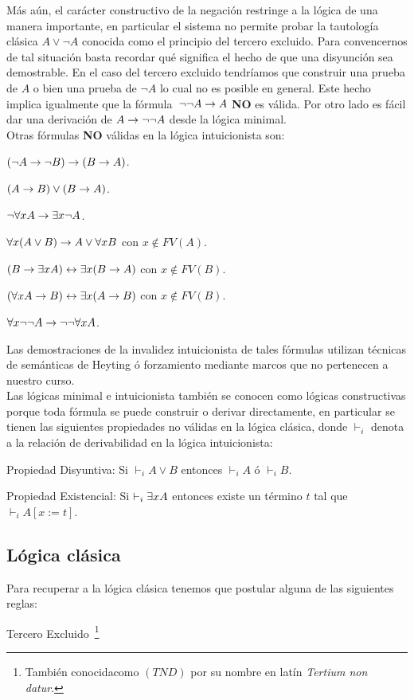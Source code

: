 \documentclass[11pt,letterpaper]{article}
\begin{document}
Más aún, el carácter constructivo de la negación restringe a la lógica de una 
manera importante, en particular el sistema no permite probar la tautología 
clásica $  A\lor\lnot A $
conocida como el principio del tercero excluido. Para convencernos de tal
situación basta recordar qué significa el hecho de que una disyunción sea
demostrable. En el caso del tercero excluido tendríamos que construir 
una prueba de $ A$ o bien una prueba de $\neg A$ lo cual no es posible en
general. Este hecho implica igualmente que la fórmula~$\lnot\lnot A\imp A$
\textbf{NO} es válida. Por otro lado es fácil dar una derivación
de $ A\imp\lnot\lnot A$ desde la lógica minimal. \\
Otras fórmulas \textbf{NO} válidas en la lógica intuicionista son:
\bi
\item $(\lnot A\imp\lnot B)\imp( B\imp A)$.
\item $( A\imp B)\lor( B\imp A)$.
\item $\lnot\fa x A\imp\ex x\neg A$.
\item $\fa x( A\lor B)\imp A\lor\fa x B$ con $x\notin FV( A)$.
\item $( B\imp\ex x A)\iff \ex x( B\imp A)$ con $x\notin FV( B)$.
\item $(\fa x A\imp B)\iff \ex x( A\imp B)$ con $x\notin FV( B)$.
\item $\fa x\lnot\lnot A\imp \lnot\lnot\fa x A$.
\ei

Las demostraciones de la invalidez intuicionista de tales fórmulas utilizan 
técnicas de semánticas de Heyting ó forzamiento mediante marcos que no 
pertenecen a nuestro curso.\\

Las lógicas minimal e intuicionista también se conocen como lógicas 
constructivas porque toda fórmula se puede construir o derivar directamente,
en particular se tienen las siguientes propiedades no válidas en la lógica 
clásica, donde $\vdash_i$ denota a la relación de derivabilidad en la lógica intuicionista:
\bi
 \item Propiedad Disyuntiva: Si $\vdash_{i} A\lor B$ entonces
  $\vdash_{i} A$ ó $\vdash_{i} B$.
 \item Propiedad Existencial: Si $\vdash_{i} \ex x A$ entonces existe un
  término $t$ tal que $\vdash_{i} A[x:=t]$.
\ei


\subsection{Lógica clásica}
Para recuperar a la lógica clásica tenemos que postular alguna de las
siguientes reglas:
\bi
\item Tercero Excluido~\footnote{También conocidacomo $(TND)$ por
  su nombre en latín \textit{Tertium non datur}.}
\begin{mathpar}
\end{mathpar}
\end{document}
